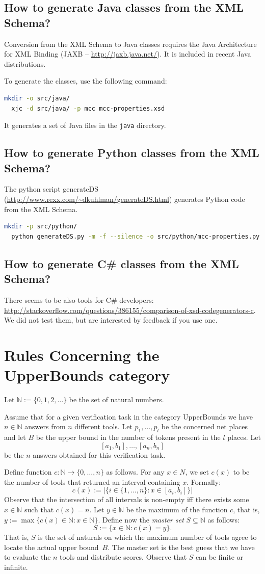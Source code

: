\documentclass[10pt,english,a4paper]{article}
\newcommand\eqdef            {\mathrel{:=}}
\newcommand\set[1]           {{\{ #1 \mathclose \}}}
\newcommand\N                {\mathbb{N}}
\newcommand\mysection[1]{\color{sectioncolor}\section{#1}\color{defaultcolor}}
\newcommand\mysubsection[1]{\color{sectioncolor}\subsection{#1}\color{defaultcolor}}
\begin{document}
\mysubsection{How to generate Java classes from the XML Schema?}
Conversion from the XML Schema to Java classes requires the Java Architecture for XML Binding
(JAXB -- \url{http://jaxb.java.net/}).
It is included in recent Java distributions.

To generate the classes, use the following command:
\begin{lstlisting}[language=sh]
  mkdir -o src/java/
  xjc -d src/java/ -p mcc mcc-properties.xsd
\end{lstlisting}
It generates a set of Java files in the \lstinline!java! directory.

\mysubsection{How to generate Python classes from the XML Schema?}
The python script generateDS (\url{http://www.rexx.com/~dkuhlman/generateDS.html}) generates Python code from the XML Schema.

\begin{lstlisting}[language=sh]
  mkdir -p src/python/
  python generateDS.py -m -f --silence -o src/python/mcc-properties.py mcc-properties.xsd
\end{lstlisting}

\mysubsection{How to generate C\# classes from the XML Schema?}
There seems to be also tools for C\# developers: \\
\url{http://stackoverflow.com/questions/386155/comparison-of-xsd-codegenerators-c}.
We did not test them, but are interested by feedback if you use one.
\fi

\mysection{Rules Concerning the UpperBounds category}


Let $\N \eqdef \set{0, 1, 2, \ldots}$ be the set of natural numbers.

Assume that for a given verification task in the category
UpperBounds we have $n \in \N$ answers from $n$ different tools.
Let $p_1, \ldots, p_l$ be the concerned net places and let $B$ be the upper
bound in the number of tokens present in the $l$ places.
Let
\[
[a_1, b_1], \ldots, [a_n, b_n]
\]
be the $n$ answers obtained for this verification task.

Define function $c \colon \N \to \set{0, \ldots, n}$ as follows.
For any $x \in N$, we set $c(x)$ to be the number of tools that returned an
interval containing $x$. Formally:
\[
c(x) \eqdef |\set{i \in \set{1, \ldots, n} \colon x \in [a_i,b_i]}|
\]
Observe that the intersection of all intervals is non-empty iff
there exists some $x \in \N$ such that $c(x) = n$.
Let $y \in \N$ be the maximum of the function $c$, that is,
$y \eqdef \max\set{c(x) \in \N \colon x \in \N}$.
Define now the \emph{master set} $S \subseteq \N$ as follows:
\[
S \eqdef \set{x \in \N \colon c(x) = y}.
\]
That is, $S$ is the set of naturals on which the maximum number of tools agree
to locate the actual upper bound~$B$.
The master set is the best guess that we have to evaluate the $n$ tools and
distribute scores. Observe that $S$ can be finite or infinite.
\end{document}
